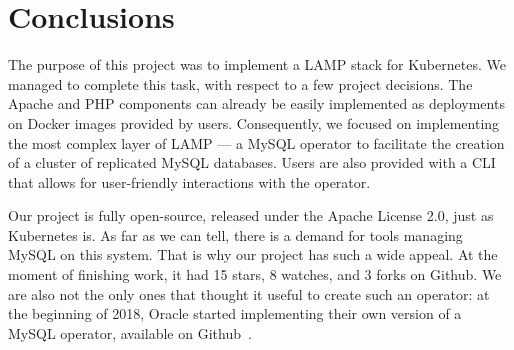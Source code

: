 \section{Conclusions}
The purpose of this project was to implement a LAMP stack for Kubernetes. We managed to complete
this task, with respect to a few project decisions. The Apache and PHP
components can already be easily implemented as
deployments on Docker images provided by users. Consequently, we focused on implementing the most
complex layer of LAMP --- a MySQL operator to facilitate the creation of a cluster of replicated
MySQL databases. Users are also provided with a CLI that allows for user-friendly interactions with
the operator.

Our project is fully open-source, released under the Apache License 2.0, just as Kubernetes is. As
far as we can tell, there is a demand for tools managing MySQL on this system. That is why our
project has such a wide appeal. At the moment of finishing work, it had 15 stars, 8 watches, and 3
forks on Github. We are also not the only ones that thought it useful to create
such an operator: at the beginning of 2018, Oracle started implementing their
own version of a MySQL operator, available on Github~\cite{oracle}.
